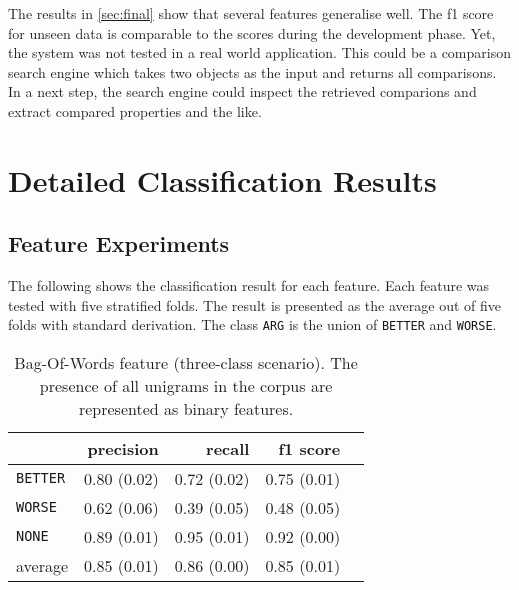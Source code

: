 The results in \ref{sec:final} show that several features generalise well. The f1 score for unseen data is comparable to the scores during the development phase. Yet, the system was not tested in a real world application. This could be a comparison search engine which takes two objects as the input and returns all comparisons. In a next step, the search engine could inspect the retrieved comparions and extract compared properties and the like.

\appendix

	\chapter{Detailed Classification Results}
\section{Feature Experiments}
	\setcounter{section}{1}
	The following shows the classification result for each feature. Each feature was tested with five stratified folds. The result is presented as the average out of five folds with standard derivation. The class \texttt{ARG} is the union of \texttt{BETTER} and \texttt{WORSE}.
	

	
	\begin{table}[h] 
		\centering 
		\caption{Bag-Of-Words feature (three-class scenario). The presence of all unigrams in the corpus are represented as binary features.} 
		\label{  }
		\begin{tabular}{@{}lrrrr@{}}
			\toprule
			        & precision                & recall                   & f1 score                 \\ \midrule 
			\texttt{BETTER}  & 0.80 \scriptsize{(0.02)} & 0.72 \scriptsize{(0.02)} & 0.75 \scriptsize{(0.01)} \\ 
			\texttt{WORSE}   & 0.62 \scriptsize{(0.06)} & 0.39 \scriptsize{(0.05)} & 0.48 \scriptsize{(0.05)} \\ 
			\texttt{NONE}    & 0.89 \scriptsize{(0.01)} & 0.95 \scriptsize{(0.01)} & 0.92 \scriptsize{(0.00)} \\ 
			average & 0.85 \scriptsize{(0.01)} & 0.86 \scriptsize{(0.00)} & 0.85 \scriptsize{(0.01)} \\ 
			\bottomrule
		\end{tabular}
	\end{table}
	
